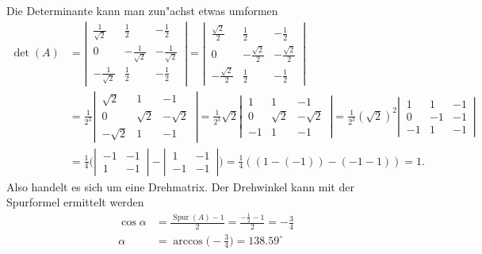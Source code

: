 \begin{loesung}
Die Determinante kann man zun"achst etwas umformen
\begin{align*}
\det(A)
&=
\left|\,\begin{matrix}
\frac1{\sqrt{2}}&\frac12&-\frac12\\
0&-\frac1{\sqrt{2}}&-\frac1{\sqrt{2}}\\
-\frac1{\sqrt{2}}&\frac12&-\frac12
\end{matrix}\,\right|
=
\left|\,\begin{matrix}
\frac{\sqrt{2}}2&\frac12&-\frac12\\
0&-\frac{\sqrt{2}}2&-\frac{\sqrt{2}}2\\
-\frac{\sqrt{2}}2&\frac12&-\frac12
\end{matrix}\,\right|
\\
&=
\frac1{2^3}
\left|\,\begin{matrix}
\sqrt{2}&1&-1\\
0&\sqrt{2}&-\sqrt{2}\\
-\sqrt{2}&1&-1
\end{matrix}\,\right|
=
\frac1{2^3}\sqrt{2}
\left|\,\begin{matrix}
1&1&-1\\
0&\sqrt{2}&-\sqrt{2}\\
-1&1&-1
\end{matrix}\,\right|
=
\frac1{2^3}(\sqrt{2})^2
\left|\,\begin{matrix}
1&1&-1\\
0&-1&-1\\
-1&1&-1
\end{matrix}\,\right|
\\
&=
\frac14\biggl(
\left|\,\begin{matrix}
-1&-1\\1&-1
\end{matrix}\,\right|
-
\left|\,\begin{matrix}
1&-1\\
-1&-1
\end{matrix}\,\right|
\biggr)=\frac14((1-(-1))-(-1-1))=1.
\end{align*}
Also handelt es sich um eine Drehmatrix. Der Drehwinkel kann mit der
Spurformel ermittelt werden
\begin{align*}
\cos\alpha&=\frac{\operatorname{Spur}(A)-1}2=\frac{-\frac12-1}2=-\frac34
\\
\alpha&=\arccos\biggl(-\frac34\biggr)=138.59^\circ
\end{align*}
\end{loesung}

